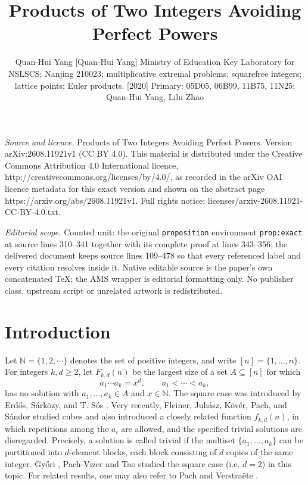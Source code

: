 \documentclass[10pt,a4paper]{amsart}
\numberwithin{equation}{section}
\newcommand{\N}{\mathbb N}
\newcommand{\1}{\mathbf 1}
\begin{document}
\title[Products of Two Integers Avoiding Perfect Powers]{Products of Two Integers Avoiding Perfect Powers}
\author{Quan-Hui Yang [Quan-Hui Yang] Ministry of Education Key Laboratory for NSLSCS; Nanjing 210023; multiplicative extremal problems; squarefree integers; lattice points; Euler products. [2020] Primary: 05D05, 06B99, 11B75, 11N25; Quan-Hui Yang, Lilu Zhao}
\date{}
\maketitle
\noindent\emph{Source and licence.} Products of Two Integers Avoiding Perfect Powers. Version arXiv:2608.11921v1 (CC BY 4.0). This material is distributed under the Creative Commons Attribution 4.0 International licence, http://creativecommons.org/licenses/by/4.0/, as recorded in the arXiv OAI licence metadata for this exact version and shown on the abstract page https://arxiv.org/abs/2608.11921v1. Full rights notice: licenses/arxiv-2608.11921-CC-BY-4.0.txt.\par\smallskip
\noindent\textit{Editorial scope.} Counted unit: the original \texttt{proposition} environment \texttt{prop:exact} at source lines 310--341 together with its complete proof at lines 343--356; the delivered document keeps source lines 109--478 so that every referenced label and every citation resolves inside it. Native editable source is the paper's own concatenated TeX; the AMS wrapper is editorial formatting only. No publisher class, upstream script or unrelated artwork is redistributed.
\section{Introduction}

Let $\N=\{1,2,\cdots\}$ denotes the set of positive integers, and write $[n]=\{1,\ldots,n\}$.  For integers $k,d\geq2$, let
$F_{k,d}(n)$ be the largest size of a set $A\subseteq[n]$ for which
\[
 a_1\cdots a_k=x^d,
 \qquad a_1<\cdots<a_k,
\]
has no solution with $a_1,\ldots,a_k\in A$ and $x\in\mathbb{N}$.  The square
case was introduced by Erd\H{o}s, S\'ark\"ozy, and T. S\'os
\cite{ESS}.  Very recently, Fleiner, Juh\'asz, K\"ov\'er, Pach, and S\'andor
\cite{FJKPS} studied cubes and also introduced a closely related
function $f_{k,d}(n)$, in which repetitions among the $a_i$ are allowed,
and the specified trivial solutions are disregarded. Precisely, a solution is called trivial if the multiset $\{a_1,\ldots,a_k\}$ can be partitioned into $d$-element blocks, each block consisting of $d$ copies of the same integer. Gy\H{o}ri \cite{G},  Pach-Vizer \cite{PV} and Tao \cite{Tao} studied the square case (i.e. $d=2$) in this topic. For related results, one may also refer to Pach \cite{Pach2015,Pach2019} and Verstra\"ete \cite{V}.  
\end{document}
